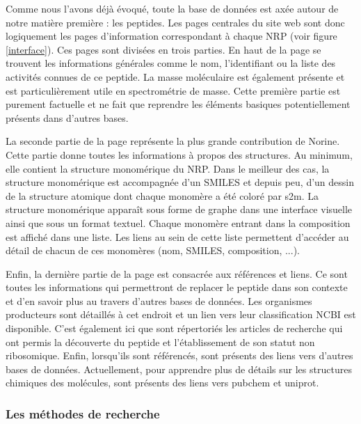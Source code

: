 Comme nous l'avons déjà évoqué, toute la base de données est axée autour de notre matière première : les peptides.
Les pages centrales du site web sont donc logiquement les pages d'information correspondant à chaque NRP (voir figure \ref{interface}).
Ces pages sont divisées en trois parties.
En haut de la page se trouvent les informations générales comme le nom, l'identifiant ou la liste des activités connues de ce peptide.
La masse moléculaire est également présente et est particulièrement utile en spectrométrie de masse.
Cette première partie est purement factuelle et ne fait que reprendre les éléments basiques potentiellement présents dans d'autres bases.

La seconde partie de la page représente la plus grande contribution de Norine.
Cette partie donne toutes les informations à propos des structures.
Au minimum, elle contient la structure monomérique du NRP.
Dans le meilleur des cas, la structure monomérique est accompagnée d'un SMILES et depuis peu, d'un dessin de la structure atomique dont chaque monomère a été coloré par s2m.
La structure monomérique apparaît sous forme de graphe dans une interface visuelle ainsi que sous un format textuel.
Chaque monomère entrant dans la composition est affiché dans une liste.
Les liens au sein de cette liste permettent d'accéder au détail de chacun de ces monomères (nom, SMILES, composition, ...).

Enfin, la dernière partie de la page est consacrée aux références et liens.
Ce sont toutes les informations qui permettront de replacer le peptide dans son contexte et d'en savoir plus au travers d'autres bases de données.
Les organismes producteurs sont détaillés à cet endroit et un lien vers leur classification NCBI est disponible.
C'est également ici que sont répertoriés les articles de recherche qui ont permis la découverte du peptide et l'établissement de son statut non ribosomique.
Enfin, lorsqu'ils sont référencés, sont présents des liens vers d'autres bases de données.
Actuellement, pour apprendre plus de détails sur les structures chimiques des molécules, sont présents des liens vers pubchem et uniprot.


\subsubsection{Les méthodes de recherche}

